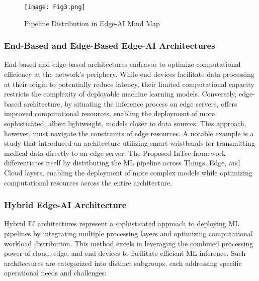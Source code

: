 	\begin{figure}[h]
		\centering
		\texttt{[image: Fig3.png]}
		\caption{Pipeline Distribution in Edge-AI Mind Map}
	\end{figure}
	
	\subsubsection{End-Based and Edge-Based Edge-AI Architectures}
	End-based and edge-based architectures endeavor to optimize computational efficiency at the network's periphery. While end devices facilitate data processing at their origin to potentially reduce latency, their limited computational capacity restricts the complexity of deployable machine learning models. Conversely, edge-based architecture, by situating the inference process on edge servers, offers improved computational resources, enabling the deployment of more sophisticated, albeit lightweight, models closer to data sources. This approach, however, must navigate the constraints of edge resources. A notable example is a study \cite{c27} that introduced an architecture utilizing smart wristbands for transmitting medical data directly to an edge server. The Proposed InTec framework differentiates itself by
	distributing the ML pipeline across Things, Edge, and Cloud layers, enabling the
	deployment of more complex models while optimizing computational resources
	across the entire architecture.
	
	\subsubsection{Hybrid Edge-AI Architecture}
	Hybrid EI architectures represent a sophisticated approach to deploying ML pipelines by integrating multiple processing layers and optimizing computational workload distribution. This method excels in leveraging the combined processing power
	of cloud, edge, and end devices to facilitate efficient ML inference. Such architectures are categorized into distinct subgroups, each addressing specific operational
	needs and challenges:
	
